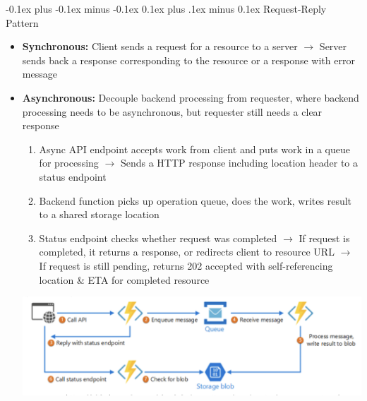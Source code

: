 \documentclass[landscape]{article}
\makeatletter
\renewcommand{\subsection}{\@startsection{subsection}{2}{0mm}%
  {-0.1ex plus -0.1ex minus -0.1ex}%
  {0.1ex plus .1ex minus 0.1ex}%
{\normalfont\scriptsize\bfseries}}
\makeatother
\begin{document}
\begin{multicols*}{5}
    \subsection{Request-Reply Pattern}
    \begin{itemize}
      \item \textbf{Synchronous:} Client sends a request for a resource to a server $\rightarrow$ Server sends back a response corresponding to the resource or a response with error message
      \item \textbf{Asynchronous:} Decouple backend processing from requester, where backend processing needs to be asynchronous, but requester still needs a clear response
      \begin{enumerate}
        \item Async API endpoint accepts work from client and puts work in a queue for processing $\rightarrow$ Sends a HTTP response including location header to a status endpoint
        \item Backend function picks up operation queue, does the work, writes result to a shared storage location
        \item Status endpoint checks whether request was completed $\rightarrow$ If request is completed, it returns a response, or redirects client to resource URL $\rightarrow$ If request is still pending, returns 202 accepted with self-referencing location \& ETA for completed resource
      \end{enumerate}
      \includegraphics[width=0.85\linewidth]{4_async_request_reply.png}
    \end{itemize}


\end{multicols*}
\end{document}
